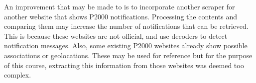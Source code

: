 An improvement that may be made to is to incorporate another scraper for another website that shows P2000 notifications. Processing the contents and comparing them may increase the number of notifications that can be retrieved. This is because these websites are not official, and use decoders to detect notification messages. Also, some existing P2000 websites already show possible associations or geolocations. These may be used for reference but for the purpose of this course, extracting this information from those websites was deemed too complex.

